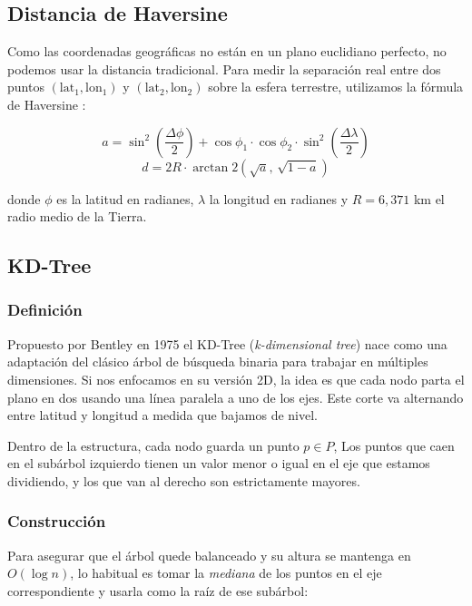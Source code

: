 \documentclass[11pt, a4paper]{article}
\begin{document}
\subsection{Distancia de Haversine}

Como las coordenadas geográficas no están en un plano euclidiano perfecto, no podemos usar la distancia tradicional. Para medir la separación real entre dos puntos $(\text{lat}_1, \text{lon}_1)$ y
$(\text{lat}_2, \text{lon}_2)$ sobre la esfera terrestre, utilizamos la fórmula de Haversine \cite{sinnott1984virtues}:

\[
    a = \sin^2\!\left(\frac{\Delta\phi}{2}\right)
      + \cos\phi_1 \cdot \cos\phi_2 \cdot \sin^2\!\left(\frac{\Delta\lambda}{2}\right)
\]
\[
    d = 2R \cdot \arctan2\!\left(\sqrt{a},\, \sqrt{1-a}\right)
\]

donde $\phi$ es la latitud en radianes, $\lambda$ la longitud en radianes
y $R = 6{,}371$ km el radio medio de la Tierra.

\subsection{KD-Tree}

\subsubsection{Definición}

Propuesto por Bentley en 1975 \cite{bentley1975multidimensional} el KD-Tree (\textit{k-dimensional tree})
nace como una adaptación del clásico árbol de búsqueda binaria para trabajar en múltiples dimensiones. Si nos enfocamos en su versión 2D, la idea es que cada nodo parta el plano en dos usando una línea paralela a uno de los ejes. Este corte va alternando entre latitud y longitud a medida que bajamos de nivel.

Dentro de la estructura, cada nodo guarda un punto $p \in P$, Los puntos que caen en el subárbol izquierdo tienen un valor menor o igual en el eje que estamos dividiendo, y los que van al derecho son estrictamente mayores.

\subsubsection{Construcción}

Para asegurar que el árbol quede balanceado y su altura se mantenga en $O(\log n)$, lo habitual es tomar la \textit{mediana} de los puntos en el eje correspondiente y usarla como la raíz de ese subárbol:
\end{document}
